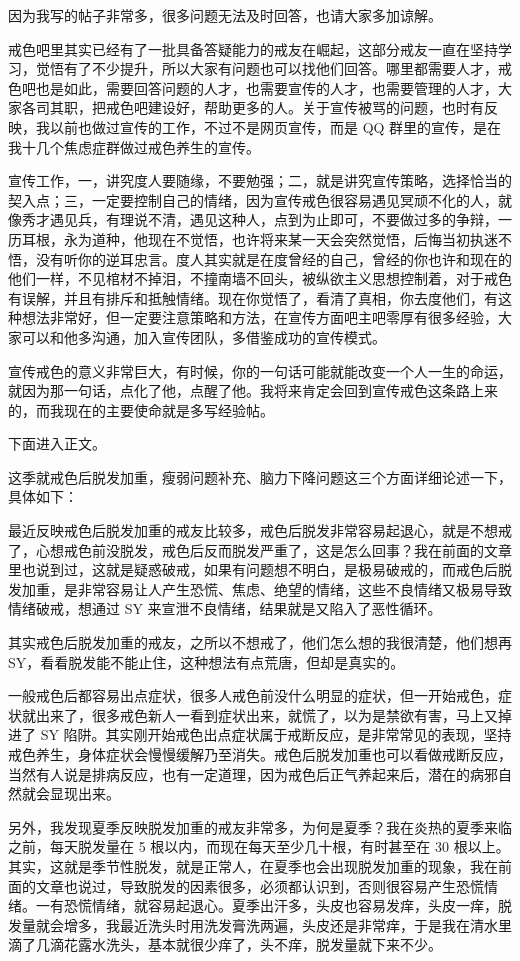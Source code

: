 \documentclass{ctexart}
\begin{document}
因为我写的帖子非常多，很多问题无法及时回答，也请大家多加谅解。

戒色吧里其实已经有了一批具备答疑能力的戒友在崛起，这部分戒友一直在坚持学习，觉悟有了不少提升，所以大家有问题也可以找他们回答。哪里都需要人才，戒色吧也是如此，需要回答问题的人才，也需要宣传的人才，也需要管理的人才，大家各司其职，把戒色吧建设好，帮助更多的人。关于宣传被骂的问题，也时有反映，我以前也做过宣传的工作，不过不是网页宣传，而是 QQ 群里的宣传，是在我十几个焦虑症群做过戒色养生的宣传。

宣传工作，一，讲究度人要随缘，不要勉强；二，就是讲究宣传策略，选择恰当的契入点；三，一定要控制自己的情绪，因为宣传戒色很容易遇见冥顽不化的人，就像秀才遇见兵，有理说不清，遇见这种人，点到为止即可，不要做过多的争辩，一历耳根，永为道种，他现在不觉悟，也许将来某一天会突然觉悟，后悔当初执迷不悟，没有听你的逆耳忠言。度人其实就是在度曾经的自己，曾经的你也许和现在的他们一样，不见棺材不掉泪，不撞南墙不回头，被纵欲主义思想控制着，对于戒色有误解，并且有排斥和抵触情绪。现在你觉悟了，看清了真相，你去度他们，有这种想法非常好，但一定要注意策略和方法，在宣传方面吧主吧零厚有很多经验，大家可以和他多沟通，加入宣传团队，多借鉴成功的宣传模式。

宣传戒色的意义非常巨大，有时候，你的一句话可能就能改变一个人一生的命运，就因为那一句话，点化了他，点醒了他。我将来肯定会回到宣传戒色这条路上来的，而我现在的主要使命就是多写经验帖。

下面进入正文。

这季就戒色后脱发加重，瘦弱问题补充、脑力下降问题这三个方面详细论述一下，具体如下：

最近反映戒色后脱发加重的戒友比较多，戒色后脱发非常容易起退心，就是不想戒了，心想戒色前没脱发，戒色后反而脱发严重了，这是怎么回事？我在前面的文章里也说到过，这就是疑惑破戒，如果有问题想不明白，是极易破戒的，而戒色后脱发加重，是非常容易让人产生恐慌、焦虑、绝望的情绪，这些不良情绪又极易导致情绪破戒，想通过 SY 来宣泄不良情绪，结果就是又陷入了恶性循环。

其实戒色后脱发加重的戒友，之所以不想戒了，他们怎么想的我很清楚，他们想再 SY，看看脱发能不能止住，这种想法有点荒唐，但却是真实的。

一般戒色后都容易出点症状，很多人戒色前没什么明显的症状，但一开始戒色，症状就出来了，很多戒色新人一看到症状出来，就慌了，以为是禁欲有害，马上又掉进了 SY 陷阱。其实刚开始戒色出点症状属于戒断反应，是非常常见的表现，坚持戒色养生，身体症状会慢慢缓解乃至消失。戒色后脱发加重也可以看做戒断反应，当然有人说是排病反应，也有一定道理，因为戒色后正气养起来后，潜在的病邪自然就会显现出来。

另外，我发现夏季反映脱发加重的戒友非常多，为何是夏季？我在炎热的夏季来临之前，每天脱发量在 5 根以内，而现在每天至少几十根，有时甚至在 30 根以上。其实，这就是季节性脱发，就是正常人，在夏季也会出现脱发加重的现象，我在前面的文章也说过，导致脱发的因素很多，必须都认识到，否则很容易产生恐慌情绪。一有恐慌情绪，就容易起退心。夏季出汗多，头皮也容易发痒，头皮一痒，脱发量就会增多，我最近洗头时用洗发膏洗两遍，头皮还是非常痒，于是我在清水里滴了几滴花露水洗头，基本就很少痒了，头不痒，脱发量就下来不少。
\end{document}
